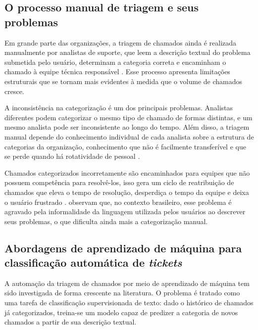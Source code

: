 \documentclass[
    12pt,                %
    openright,           %
    oneside,             %
    a4paper,             %
    english,             %
    brazil               %
]{abntex2}
\begin{document}
\subsection{O processo manual de triagem e seus problemas}
\label{subsec:helpdesk_triagem}

Em grande parte das organizações, a triagem de chamados ainda é realizada manualmente por analistas de suporte, que leem a descrição textual do problema submetida pelo usuário, determinam a categoria correta e encaminham o chamado à equipe técnica responsável \cite{zemp2021}. Esse processo apresenta limitações estruturais que se tornam mais evidentes à medida que o volume de chamados cresce.

A inconsistência na categorização é um dos principais problemas. Analistas diferentes podem categorizar o mesmo tipo de chamado de formas distintas, e um mesmo analista pode ser inconsistente ao longo do tempo. Além disso, a triagem manual depende do conhecimento individual de cada analista sobre a estrutura de categorias da organização, conhecimento que não é facilmente transferível e que se perde quando há rotatividade de pessoal \cite{wahba2023}.

Chamados categorizados incorretamente são encaminhados para equipes que não possuem competência para resolvê-los, isso gera um ciclo de reatribuição de chamados que eleva o tempo de resolução, desperdiça o tempo da equipe e deixa o usuário frustrado \cite{harun2023}.  observam que, no contexto brasileiro, esse problema é agravado pela informalidade da linguagem utilizada pelos usuários ao descrever seus problemas, o que dificulta ainda mais a categorização manual.

\subsection{Abordagens de aprendizado de máquina para classificação automática de \textit{tickets}}
\label{subsec:helpdesk_ml}

A automação da triagem de chamados por meio de aprendizado de máquina tem sido investigada de forma crescente na literatura. O problema é tratado como uma tarefa de classificação supervisionada de texto: dado o histórico de chamados já categorizados, treina-se um modelo capaz de predizer a categoria de novos chamados a partir de sua descrição textual.

\end{document}
